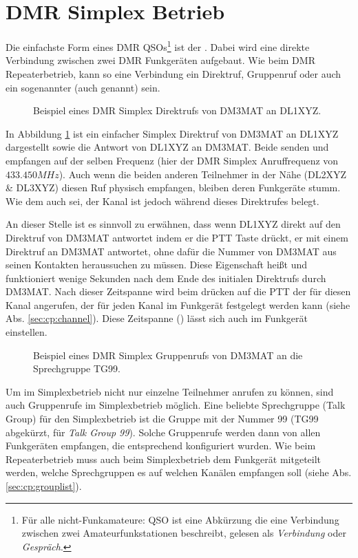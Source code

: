 \section{DMR Simplex Betrieb} \label{sec:simplex}
Die einfachste Form eines DMR QSOs\footnote{Für alle nicht-Funkamateure: QSO ist eine Abkürzung die eine Verbindung zwischen zwei Amateurfunkstationen beschreibt, gelesen als \emph{Verbindung} oder \emph{Gespräch}.} ist der . Dabei wird eine direkte Verbindung zwischen zwei DMR Funkgeräten aufgebaut. Wie beim DMR Repeaterbetrieb, kann so eine Verbindung ein Direktruf, Gruppenruf oder auch ein sogenannter  (auch  genannt) sein. 

\begin{figure}[!ht]
 \centering
 
 \caption{Beispiel eines DMR Simplex Direktrufs von DM3MAT an DL1XYZ.} \label{fig:splxpc}
\end{figure}

In Abbildung \ref{fig:splxpc} ist ein einfacher Simplex Direktruf von DM3MAT an DL1XYZ dargestellt sowie die Antwort von DL1XYZ an DM3MAT. Beide senden und empfangen auf der selben Frequenz (hier der DMR Simplex Anruffrequenz von $433.450 MHz$). Auch wenn die beiden anderen Teilnehmer in der Nähe (DL2XYZ \& DL3XYZ) diesen Ruf physisch empfangen, bleiben deren Funkgeräte stumm. Wie dem auch sei, der Kanal ist jedoch während dieses Direktrufes belegt. 

An dieser Stelle ist es sinnvoll zu erwähnen, dass wenn DL1XYZ direkt auf den Direktruf von DM3MAT antwortet indem er die PTT Taste drückt, er mit einem Direktruf an DM3MAT antwortet, ohne dafür die Nummer von DM3MAT aus seinen Kontakten heraussuchen zu müssen. Diese Eigenschaft heißt  und funktioniert wenige Sekunden nach dem Ende des initialen Direktrufs durch DM3MAT. Nach dieser Zeitspanne wird beim drücken auf die PTT der  für diesen Kanal angerufen, der für jeden Kanal im Funkgerät festgelegt werden kann (siehe Abs. \ref{sec:cp:channel}). Diese Zeitspanne () lässt sich auch im Funkgerät einstellen.

\begin{figure}[!ht]
  \centering
  
  \caption{Beispiel eines DMR Simplex Gruppenrufs von DM3MAT an die Sprechgruppe TG99.} \label{fig:splxgc}
\end{figure}

Um im Simplexbetrieb nicht nur einzelne Teilnehmer anrufen zu können, sind auch Gruppenrufe im Simplexbetrieb möglich. Eine beliebte Sprechgruppe (Talk Group) für den Simplexbetrieb ist die Gruppe mit der Nummer 99  (TG99 abgekürzt, für \emph{Talk Group 99}). Solche Gruppenrufe werden dann von allen Funkgeräten empfangen, die entsprechend konfiguriert wurden. Wie beim Repeaterbetrieb muss auch beim Simplexbetrieb dem Funkgerät mitgeteilt werden, welche Sprechgruppen es auf welchen Kanälen empfangen soll (siehe Abs. \ref{sec:cp:grouplist}). 

